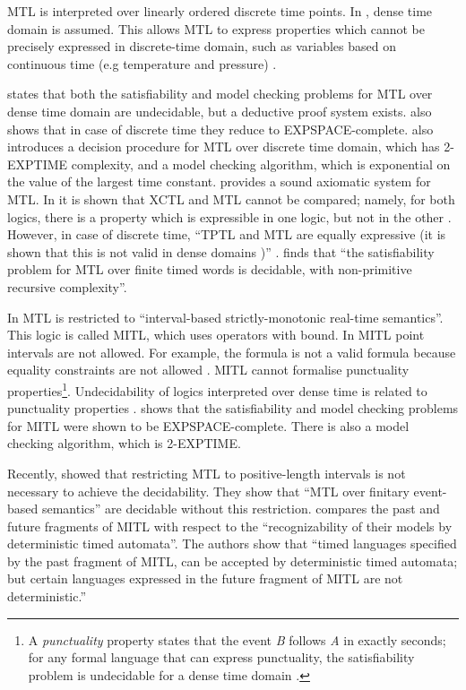 \documentclass[11pt]{article}
\begin{document}
MTL is interpreted over linearly ordered discrete time points.  In \cite{Koy90}, dense time domain is assumed. This allows MTL to express properties which cannot be precisely expressed in discrete-time domain, such as variables based on continuous time (e.g temperature and pressure) \cite{Ost92}. 

\cite{AH90} states that both the satisfiability and model checking problems for MTL over dense time domain are undecidable, but a deductive proof system exists. \cite{AH90} also shows that in case of discrete time they reduce to 
EXPSPACE-complete. \cite{AH90} also introduces a decision procedure for MTL over discrete time domain, which has 
2-EXPTIME complexity, and a model checking algorithm,  which is exponential on the value of the largest time constant. \cite{Koy90} provides a sound axiomatic system for MTL.  In \cite{HLN90} it is shown that XCTL and MTL cannot be compared; namely, for both logics, there is a property which is expressible in one logic, but not in the other \cite{Ost92}. However, in case of discrete time, ``TPTL and MTL are equally expressive (it is shown that this is not valid in dense domains \cite{Hen91})'' \cite{Ost92}. \cite{OW05} finds that ``the satisfiability problem for MTL over finite timed words is decidable, with non-primitive recursive complexity''.

In \cite{AFH91} MTL is restricted to ``interval-based strictly-monotonic real-time semantics''. This logic is called MITL, which uses operators with bound. In MITL point intervals are not allowed.  For example, the formula  is not a valid formula because equality constraints are not allowed \cite{AHT92}. MITL cannot formalise punctuality properties\footnote{A \emph{punctuality} property states that the event \emph{B} follows \emph{A} in exactly  seconds;  for any formal language that can express punctuality, the satisfiability problem is undecidable for a dense time domain \cite{Ost92}.}. Undecidability of logics interpreted over dense time is related to punctuality properties \cite{AHT92}. \cite{AFH91} shows that the satisfiability and model checking problems for MITL were shown to be EXPSPACE-complete. There is also a model checking algorithm, which is 2-EXPTIME. 

Recently, \cite{OW05,LW08} showed that restricting MTL to positive-length intervals is not necessary to achieve the decidability. They show that ``MTL over finitary event-based semantics'' are decidable without this restriction.  \cite{MNP05} compares the past and future fragments of  MITL with respect to the ``recognizability of their models by deterministic timed automata''. The authors show that ``timed languages specified by the past fragment of MITL, can be accepted by deterministic timed automata; but certain languages expressed in the future fragment of MITL are not deterministic.''
\end{document}
